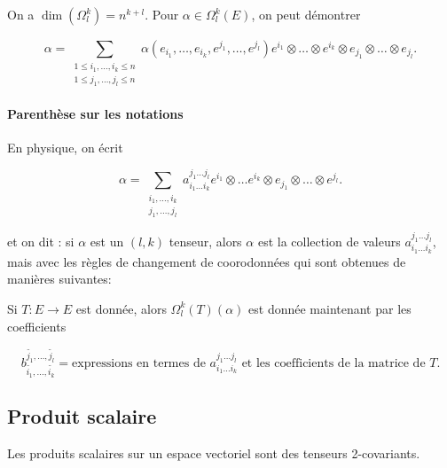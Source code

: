 \documentclass[french]{article}
\theoremstyle{definition}
\begin{document}
On a \(\operatorname{dim}(\Omega ^{k} _{l}) = n ^{k+l}\). Pour \(\alpha \in \Omega _{l} ^{k}(E)\), on peut d\'emontrer

\[\alpha = \sum_{\substack{1 \leq i_1, \dots, i_k \leq n \\ 1 \leq j_1, \dots, j_l \le n}}^{} \alpha(e _{i_1}, \dots, e _{i_k}, e ^{j_1}, \dots, e ^{j_l}) e ^{i_1} \otimes \dots \otimes e ^{i_k} \otimes e _{j_1} \otimes \dots \otimes e _{j_l}. \]

\paragraph{Parenthèse sur les notations}

En physique, on écrit

\[\alpha = \sum_{\substack{i_1, \dots, i_k \\ j_1, \dots, j_l}}^{} a _{i_1 \dots i_k} ^{j_1 \dots j_l} e ^{i_1} \otimes \dots e ^{i_k} \otimes e _{j_1} \otimes \dots \otimes e ^{j_l}. \]

et on dit : si \(\alpha\) est un \((l, k) \) tenseur, alors \(\alpha\) est la collection de valeurs \(a ^{j_1 \dots j_l} _{i_1 \dots i_k}\), mais avec les r\`egles de changement de coorodonn\'ees qui sont obtenues de mani\`eres suivantes:


Si \(T : E \to E\) est donnée, alors \(\Omega ^{k} _{l}(T)(\alpha)\) est donnée maintenant par les coefficients

\[b _{\tilde{i_1}, \dots, \tilde{i_k}} ^{\tilde{j_1}, \dots, \tilde{j_l}} = \mbox{expressions en termes de}\,\,  a ^{j_1 \dots j_l} _{i_1 \dots i_k} \,\, \mbox{et les coefficients de la matrice de}\,\, T.\]

\subsection{Produit scalaire}

Les produits scalaires sur un espace vectoriel sont des tenseurs 2-covariants.
\end{document}
